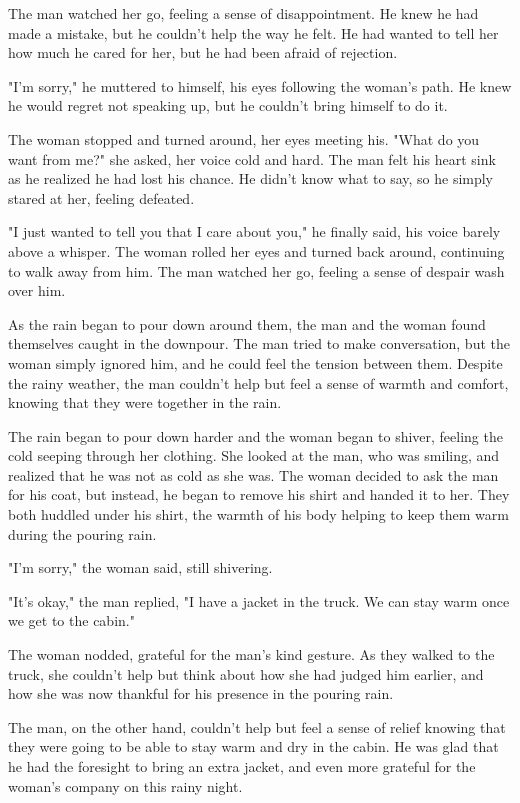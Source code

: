 \documentclass[smalldemyvopaper,11pt,twoside,onecolumn,openright,extrafontsizes]{memoir}
\begin{document}
The man watched her go, feeling a sense of disappointment. He knew he had made a mistake, but he couldn't help the way he felt. He had wanted to tell her how much he cared for her, but he had been afraid of rejection.\par
"I'm sorry," he muttered to himself, his eyes following the woman's path. He knew he would regret not speaking up, but he couldn't bring himself to do it.\par
The woman stopped and turned around, her eyes meeting his. "What do you want from me?" she asked, her voice cold and hard. The man felt his heart sink as he realized he had lost his chance. He didn't know what to say, so he simply stared at her, feeling defeated.\par
"I just wanted to tell you that I care about you," he finally said, his voice barely above a whisper. The woman rolled her eyes and turned back around, continuing to walk away from him. The man watched her go, feeling a sense of despair wash over him.\par
As the rain began to pour down around them, the man and the woman found themselves caught in the downpour. The man tried to make conversation, but the woman simply ignored him, and he could feel the tension between them. Despite the rainy weather, the man couldn't help but feel a sense of warmth and comfort, knowing that they were together in the rain.\par
The rain began to pour down harder and the woman began to shiver, feeling the cold seeping through her clothing. She looked at the man, who was smiling, and realized that he was not as cold as she was. The woman decided to ask the man for his coat, but instead, he began to remove his shirt and handed it to her. They both huddled under his shirt, the warmth of his body helping to keep them warm during the pouring rain.\par
"I'm sorry," the woman said, still shivering.\par
"It's okay," the man replied, "I have a jacket in the truck. We can stay warm once we get to the cabin."\par
The woman nodded, grateful for the man's kind gesture. As they walked to the truck, she couldn't help but think about how she had judged him earlier, and how she was now thankful for his presence in the pouring rain.\par
The man, on the other hand, couldn't help but feel a sense of relief knowing that they were going to be able to stay warm and dry in the cabin. He was glad that he had the foresight to bring an extra jacket, and even more grateful for the woman's company on this rainy night.\par
\end{document}
